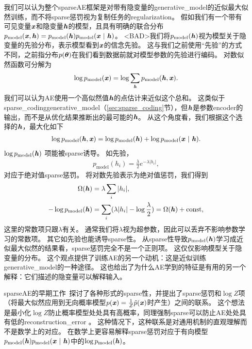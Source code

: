 
我们可以认为整个\gls{sparse}\gls{AE}框架是对带有隐变量的\gls{generative_model}的近似最大似然训练，而不将\gls{sparse}惩罚视为复制任务的\gls{regularization}。
假如我们有一个带有可见变量$\boldsymbol{\mathit{x}}$和隐变量$\boldsymbol{\mathit{h}}$的模型，且具有明确的联合分布$p_{\text{model}}(\boldsymbol{\mathit{x}},\boldsymbol{\mathit{h}})=p_{\text{model}}(\boldsymbol{\mathit{h}})p_{\text{model}} (\boldsymbol{\mathit{x}} ~|~ \boldsymbol{\mathit{h}})$。
<BAD>我们将$p_{\text{model}}(\boldsymbol{\mathit{h}})$视为模型关于隐变量的先验分布，表示模型看到$\boldsymbol{\mathit{x}}$的信念先验。
这与我们之前使用``先验''的方式不同，之前指分布$p(\boldsymbol{\theta})$在我们看到数据前就对模型参数的先验进行编码。
对数似然函数可分解为
\begin{align}
\log p_{\text{model}}(\boldsymbol{\mathit{x}})=\log \sum_{\boldsymbol{\mathit{h}}} p_{\text{model}}(\boldsymbol{\mathit{h}}, \boldsymbol{\mathit{x}}) .
\end{align}
我们可以认为\gls{AE}使用一个高似然值$\boldsymbol{\mathit{h}}$的点估计来近似这个总和。
这类似于\gls{sparse_coding}\gls{generative_model}（\ref{sec:sparse_coding}节），但$\boldsymbol{\mathit{h}}$是参数\gls{encoder}的输出，而不是从优化结果推断出的最可能的$\boldsymbol{\mathit{h}}$。
从这个角度看，我们根据这个选择的$\boldsymbol{\mathit{h}}$，最大化如下
\begin{align}
\log p_{\text{model}}(\boldsymbol{\mathit{h}}, \boldsymbol{\mathit{x}})=\log p_{\text{model}}(\boldsymbol{\mathit{h}}) + \log p_{\text{model}}(\boldsymbol{\mathit{x}} ~|~ \boldsymbol{\mathit{h}}) .
\end{align}
$\log p_{\text{model}}(\boldsymbol{\mathit{h}}) $ 项能被\gls{sparse}诱导。
如先验，
\begin{align}
p_{\text{model}}(h_i) = \frac{\lambda}{2} e^{-\lambda | h_i |},
\end{align}
对应于绝对值\gls{sparse}惩罚。
将对数先验表示为绝对值惩罚，我们得到
\begin{align}
\Omega(\boldsymbol{\mathit{h}}) &= \lambda \sum_{i} | h_i  |,\\ 
-\log p_{\text{model}}(\boldsymbol{\mathit{h}}) &= 
\sum_i (\lambda | h_i | - \log \frac{\lambda}{2}) = \Omega(\boldsymbol{\mathit{h}}) + \text{const},
\end{align}
这里的常数项只跟$\lambda$有关。
通常我们将$\lambda$视为超参数，因此可以丢弃不影响参数学习的常数项。
其它如先验也能诱导\gls{sparse}性。
从\gls{sparse}性导致$p_{\text{model}}(\boldsymbol{\mathit{h}})$学习成近似最大似然的结果看，\gls{sparse}惩罚完全不是一个正则项。
这仅仅影响模型关于隐变量的分布。
这个观点提供了训练\gls{AE}的另一个动机：这是近似训练\gls{generative_model}的一种途径。
这也给出了为什么\gls{AE}学到的特征是有用的另一个解释：它们描述的隐变量可以解释输入。


\gls{sparse}\gls{AE}的早期工作~\citep{ranzato-07-small,ranzato-08-small}探讨了各种形式的\gls{sparse}性，并提出了\gls{sparse}惩罚和$\log  Z$项（将最大似然应用到无向概率模型$p(\boldsymbol{\mathit{x}})=\frac{1}{Z}\tilde{p}(\boldsymbol{\mathit{x}})$时产生）之间的联系。
这个想法是最小化$\log Z$防止概率模型处处具有高概率，同理强制\gls{sparse}可以防止\gls{AE}处处具有低的\gls{reconstruction_error} 。
这种情况下，这种联系是对通用机制的直观理解而不是数学上的对应。
在数学上更容易解释\gls{sparse}惩罚对应于有向模型$p_{\text{model}}(\boldsymbol{\mathit{h}})p_{\text{model}}(\boldsymbol{\mathit{x}} ~|~ \boldsymbol{\mathit{h}}) $中的$\log p_{\text{model}}(\boldsymbol{\mathit{h}})$。



